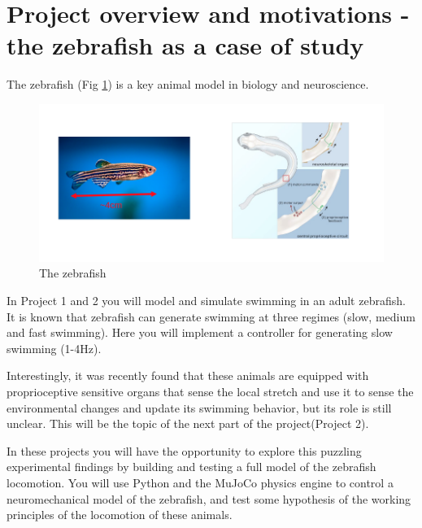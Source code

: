 \documentclass{cmc}
\begin{document}
\section*{Project overview and motivations - the zebrafish as a case of study}\label{sec:exploring-swimming}

The zebrafish (Fig \ref{fig:zebrafish}) is a key animal model in biology and neuroscience.

\begin{figure}[H]
  \centering
  \includegraphics[width=1\textwidth]{figures/zebrafish.png}
  \caption[zebrafish]{The zebrafish}\label{fig:zebrafish}
\end{figure}

In Project 1 and 2 you will model and simulate swimming in an adult zebrafish. It is known
that zebrafish can generate swimming at three regimes (slow, medium and fast swimming). Here
you will implement a controller for generating slow swimming (1-4Hz).

Interestingly, it was recently found that these animals are equipped with proprioceptive sensitive organs
that sense the local stretch and use it to sense the environmental changes and update its swimming
behavior, but its role is still unclear. This will be the topic of the next part of the project(Project 2).

In these projects you will have the opportunity to explore this puzzling experimental findings by
building and testing a full model of the zebrafish locomotion. You will use Python and the MuJoCo physics
engine to control a neuromechanical model of the zebrafish, and test some hypothesis of the working principles
of the locomotion of these animals.
\end{document}
